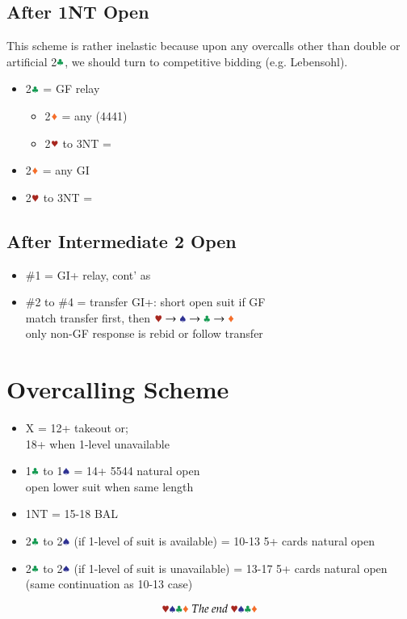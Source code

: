 \documentclass{article}
\begin{document}
\begin{multicols}{2}
\subsection{After 1NT Open}
This scheme is rather inelastic because upon any overcalls other than double or artificial 2$\ccc$, we should turn to competitive bidding (e.g. Lebensohl).

\begin{itemize}
    \item 2$\ccc$ = GF relay
    \begin{itemize}
        \item 2$\ddd$ = any (4441)
        \item 2$\hhh$ to 3NT = 
    \end{itemize}
    \item 2$\ddd$ = any GI
    \item 2$\hhh$ to 3NT = 
\end{itemize}

\subsection{After Intermediate 2 Open}
\begin{itemize}
    \item \#1 = GI+ relay, cont' as 
    \item \#2 to \#4 = transfer GI+: short open suit if GF \\
        match transfer first, then $\hhh \rightarrow \sss \rightarrow \ccc \rightarrow \ddd$ \\
        only non-GF response is rebid or follow transfer
        
\end{itemize}

\section{Overcalling Scheme}
\begin{itemize}
    \item X = 12+ takeout or; \\
        18+ when 1-level unavailable
    \item 1$\ccc$ to 1$\sss$ = 14+ 5544 natural open \\
        open lower suit when same length
    \item 1NT = 15-18 BAL
    \item 2$\ccc$ to 2$\sss$ (if 1-level of suit is available) = 10-13 5+ cards natural open
    \item 2$\ccc$ to 2$\sss$ (if 1-level of suit is unavailable) = 13-17 5+ cards natural open (same continuation as 10-13 case)
\end{itemize}

\columnbreak
$$\hhh\sss\ccc\ddd~The~end~\hhh\sss\ccc\ddd$$

\end{multicols}
\end{document}
